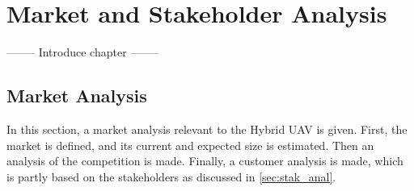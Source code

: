\chapter{Market and Stakeholder Analysis}
\setlength{\parindent}{15pt}
\label{ch:mark_stak_anal}

-------- Introduce chapter --------

\section{Market Analysis}
\label{ec:mark_anal}

In this section, a market analysis relevant to the Hybrid UAV is given. First, the market is defined, and its current and expected size is estimated. Then an analysis of the competition is made. Finally, a customer analysis is made, which is partly based on the stakeholders as discussed in \autoref{sec:stak_anal}.




